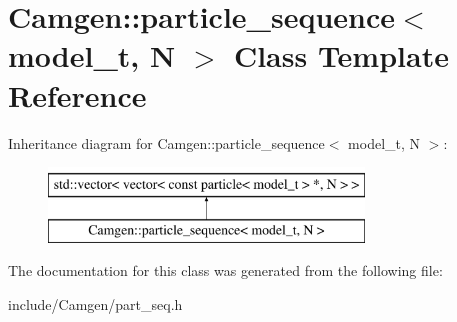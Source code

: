 \hypertarget{a00411}{}\section{Camgen\+:\+:particle\+\_\+sequence$<$ model\+\_\+t, N $>$ Class Template Reference}
\label{a00411}
Inheritance diagram for Camgen\+:\+:particle\+\_\+sequence$<$ model\+\_\+t, N $>$\+:\begin{figure}[H]
\begin{center}
\leavevmode
\includegraphics[height=2.000000cm]{a00411}
\end{center}
\end{figure}


The documentation for this class was generated from the following file\+:\begin{DoxyCompactItemize}
\item 
include/\+Camgen/part\+\_\+seq.\+h\end{DoxyCompactItemize}
